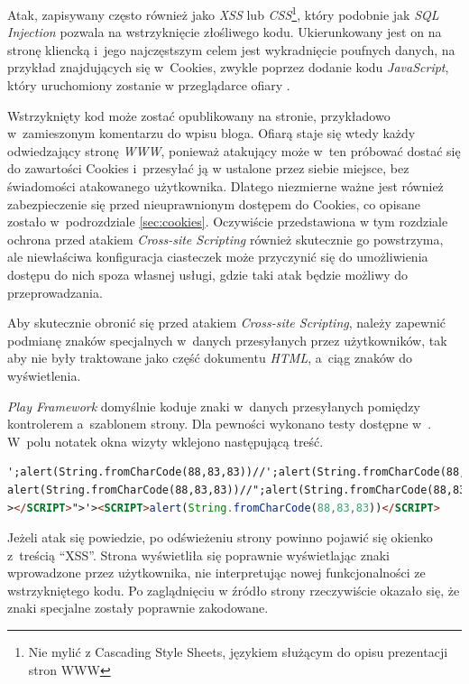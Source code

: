 \documentclass[11pt]{aghdpl}
\begin{document}
Atak, zapisywany często również jako \emph{XSS} lub \emph{CSS}\footnote{Nie mylić z Cascading Style Sheets, językiem służącym do opisu prezentacji stron WWW}, który podobnie jak \emph{SQL Injection} pozwala na wstrzyknięcie złośliwego kodu. Ukierunkowany jest on na stronę kliencką i~jego najczęstszym celem jest wykradnięcie poufnych danych, na przykład znajdujących się w~Cookies, zwykle poprzez dodanie kodu \emph{JavaScript}, który uruchomiony zostanie w przeglądarce ofiary \cite{XSSE}.

Wstrzyknięty kod może zostać opublikowany na stronie, przykładowo w~zamieszonym komentarzu do wpisu bloga. Ofiarą staje się wtedy każdy odwiedzający stronę \emph{WWW}, ponieważ atakujący może w~ten próbować dostać się do zawartości Cookies i~przesyłać ją w ustalone przez siebie miejsce, bez świadomości atakowanego użytkownika. Dlatego niezmierne ważne jest również zabezpieczenie się przed nieuprawnionym dostępem do Cookies, co opisane zostało w~podrozdziale \ref{sec:cookies}. Oczywiście przedstawiona w tym rozdziale ochrona przed atakiem \emph{Cross-site Scripting} również skutecznie go powstrzyma, ale niewłaściwa konfiguracja ciasteczek może przyczynić się do umożliwienia dostępu do nich spoza własnej usługi, gdzie taki atak będzie możliwy do przeprowadzania.

Aby skutecznie obronić się przed atakiem \emph{Cross-site Scripting}, należy zapewnić podmianę znaków specjalnych w~danych przesyłanych przez użytkowników, tak aby nie były traktowane jako część dokumentu \emph{HTML}, a~ciąg znaków do wyświetlenia.

\emph{Play Framework} domyślnie koduje znaki w~danych przesyłanych pomiędzy kontrolerem a~szablonem strony. Dla pewności wykonano testy dostępne w~\cite{XSST}. W~polu notatek okna wizyty wklejono następującą treść.

\begin{lstlisting}[language=HTML]
';alert(String.fromCharCode(88,83,83))//';alert(String.fromCharCode(88,83,83))//";
alert(String.fromCharCode(88,83,83))//";alert(String.fromCharCode(88,83,83))//--
></SCRIPT>">'><SCRIPT>alert(String.fromCharCode(88,83,83))</SCRIPT>
\end{lstlisting}

Jeżeli atak się powiedzie, po odświeżeniu strony powinno pojawić się okienko z~treścią ``XSS''. Strona wyświetliła się poprawnie wyświetlając znaki wprowadzone przez użytkownika, nie interpretując nowej funkcjonalności ze wstrzykniętego kodu. Po zaglądnięciu w źródło strony rzeczywiście okazało się, że znaki specjalne zostały poprawnie zakodowane.
\end{document}

